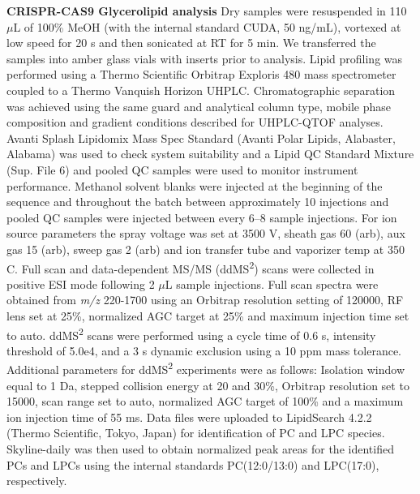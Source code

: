 \documentclass[9pt,twocolumn,twoside,lineno]{BioRxiv}
\begin{document}
\textbf{CRISPR-CAS9 Glycerolipid analysis}
Dry samples were resuspended in 110 $\mu$L of 100\% MeOH (with the internal standard CUDA, 50 ng/mL), vortexed at low speed for 20 s and then sonicated at RT for 5 min. 
We transferred the samples into amber glass vials with inserts prior to analysis. 
Lipid profiling was performed using a Thermo Scientific Orbitrap Exploris 480 mass spectrometer coupled to a Thermo Vanquish Horizon UHPLC. Chromatographic separation was achieved using the same guard and analytical column type, mobile phase composition and gradient conditions described for UHPLC-QTOF analyses. 
Avanti Splash Lipidomix Mass Spec Standard (Avanti Polar Lipids, Alabaster, Alabama) was used to check system suitability and a Lipid QC Standard Mixture (Sup. File 6) and pooled QC samples were used to monitor instrument performance. 
Methanol solvent blanks were injected at the beginning of the sequence and throughout the batch between approximately 10 injections and pooled QC samples were injected between every 6–8 sample injections. For ion source parameters the spray voltage was set at 3500 V, sheath gas 60 (arb), aux gas 15 (arb), sweep gas 2 (arb) and ion transfer tube and vaporizer temp at 350 \degree C. 
Full scan and data-dependent MS/MS (ddMS\textsuperscript{2}) scans were collected in positive ESI mode following 2 $\mu$L sample injections. 
Full scan spectra were obtained from \textit{m/z} 220-1700 using an Orbitrap resolution setting of 120000, RF lens set at 25\%, normalized AGC target at 25\% and maximum injection time set to auto. 
ddMS\textsuperscript{2} scans were performed using a cycle time of 0.6 s, intensity threshold of 5.0e4, and a 3 s dynamic exclusion using a 10 ppm mass tolerance. 
Additional parameters for ddMS\textsuperscript{2} experiments were as follows: Isolation window equal to 1 Da, stepped collision energy at 20 and 30\%, Orbitrap resolution set to 15000, scan range set to auto, normalized AGC target of 100\% and a maximum ion injection time of 55 ms. 
Data files were uploaded to LipidSearch 4.2.2 (Thermo Scientific, Tokyo, Japan) for identification of PC and LPC species. 
Skyline-daily \cite{Adams2020-em} was then used to obtain normalized peak areas for the identified PCs and LPCs using the internal standards PC(12:0/13:0) and LPC(17:0), respectively.
\end{document}
